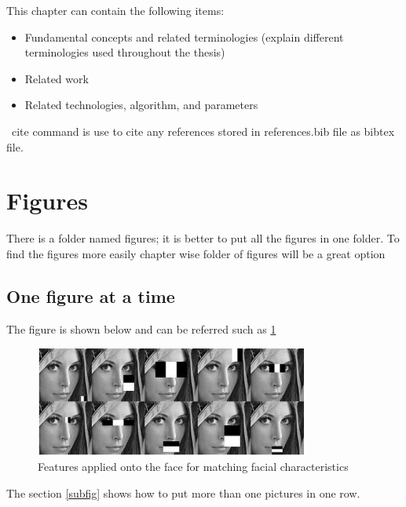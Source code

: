 This chapter can contain the following items:
\begin{itemize}
    \item Fundamental concepts and related terminologies (explain different terminologies used throughout the thesis)
    \item Related work
    \item Related technologies, algorithm, and parameters
\end{itemize}
\ cite command is use to cite any references stored in references.bib file as bibtex file.


\section{Figures}
There is a folder named figures; it is better to put all the figures in one folder. To find the figures more easily chapter wise folder of figures will be a great option
\subsection{One figure at a time}
The figure is shown below and can be referred such as \ref{label_figure}
\begin{figure}[h]
\centering
\includegraphics[width=90mm]{figures/Figure_chap2/haarf.PNG}
\caption{Features applied onto the face for matching facial characteristics}
\label{label_figure}
\end{figure}
The section \ref{subfig} shows how to put more than one pictures in one row.
